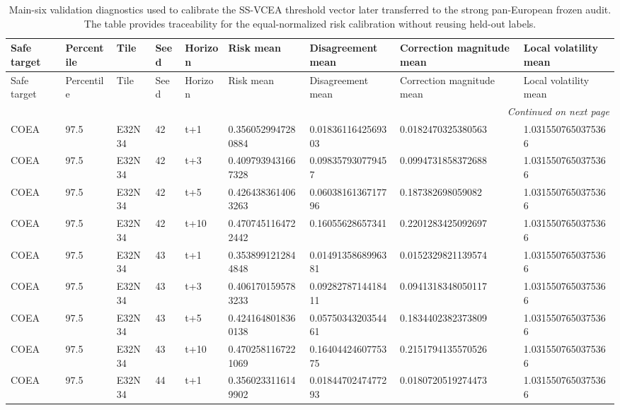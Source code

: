 \begin{landscape}
\scriptsize
\setlength{\LTleft}{0pt}
\setlength{\LTright}{0pt}
\begin{longtable}{lllllllll}
\caption{Main-six validation diagnostics used to calibrate the SS-VCEA threshold vector later transferred to the strong pan-European frozen audit. The table provides traceability for the equal-normalized risk calibration without reusing held-out labels.}\label{tab:e7_strong_threshold_diag}\\
\toprule
Safe target & Percentile & Tile & Seed & Horizon & Risk mean & Disagreement mean & Correction magnitude mean & Local volatility mean \\
\midrule
\endfirsthead
\toprule
Safe target & Percentile & Tile & Seed & Horizon & Risk mean & Disagreement mean & Correction magnitude mean & Local volatility mean \\
\midrule
\endhead
\midrule
\multicolumn{9}{r}{\textit{Continued on next page}} \\
\endfoot
\bottomrule
\endlastfoot
COEA & 97.5 & E32N34 & 42 & t+1 & 0.3560529947280884 & 0.0183611642569303 & 0.0182470325380563 & 1.0315507650375366 \\
COEA & 97.5 & E32N34 & 42 & t+3 & 0.4097939431667328 & 0.098357930779457 & 0.0994731858372688 & 1.0315507650375366 \\
COEA & 97.5 & E32N34 & 42 & t+5 & 0.4264383614063263 & 0.0603816136717796 & 0.187382698059082 & 1.0315507650375366 \\
COEA & 97.5 & E32N34 & 42 & t+10 & 0.4707451164722442 & 0.16055628657341 & 0.2201283425092697 & 1.0315507650375366 \\
COEA & 97.5 & E32N34 & 43 & t+1 & 0.3538991212844848 & 0.0149135868996381 & 0.0152329821139574 & 1.0315507650375366 \\
COEA & 97.5 & E32N34 & 43 & t+3 & 0.4061701595783233 & 0.0928278714418411 & 0.0941318348050117 & 1.0315507650375366 \\
COEA & 97.5 & E32N34 & 43 & t+5 & 0.4241648018360138 & 0.0575034320354461 & 0.1834402382373809 & 1.0315507650375366 \\
COEA & 97.5 & E32N34 & 43 & t+10 & 0.4702581167221069 & 0.1640442460775375 & 0.2151794135570526 & 1.0315507650375366 \\
COEA & 97.5 & E32N34 & 44 & t+1 & 0.3560233116149902 & 0.0184470247477293 & 0.0180720519274473 & 1.0315507650375366 \\

\end{longtable}
\end{landscape}
